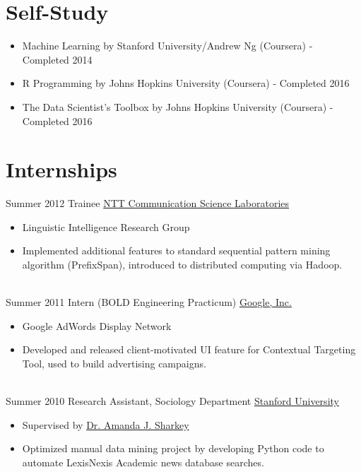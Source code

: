 \documentclass[letterpaper]{twentysecondcv} %
\begin{document}
\section{Self-Study}
\begin{itemize} \itemsep -2pt %
        \item Machine Learning by Stanford University/Andrew Ng (Coursera) - Completed 2014
       	\item R Programming by Johns Hopkins University (Coursera) - Completed 2016
        \item The Data Scientist's Toolbox by Johns Hopkins University (Coursera) - Completed 2016
\end{itemize}


\section{Internships}
\begin{twenty}
	\twentyitem
    	{Summer}
        {2012}
        {Trainee}
        {\href{http://www.kecl.ntt.co.jp/rps/index.html}{NTT Communication Science Laboratories}}
        {}
        {\begin{itemize} \itemsep -2pt %
        \item Linguistic Intelligence Research Group
       	\item Implemented additional features to standard sequential pattern mining algorithm (PrefixSpan), introduced to distributed computing via Hadoop.
        \end{itemize}}
    \\
    \twentyitem
    	{Summer}
        {2011}
        {Intern (BOLD Engineering Practicum)}
        {\href{https://careers.google.com/students/}{Google, Inc.}}
        {}
        {\begin{itemize}  \itemsep -2pt %
        \item Google AdWords Display Network
        \item Developed and released client-motivated UI feature for Contextual Targeting Tool,
            used to build advertising campaigns.
        \end{itemize}}
    \\
    \twentyitem
    	{Summer}
        {2010}
        {Research Assistant, Sociology Department}
        {\href{https://careers.google.com/students/}{Stanford University}}
        {}
        {\begin{itemize}  \itemsep -2pt %
        \item Supervised by \href{https://www.chicagobooth.edu/faculty/directory/s/amanda-j-sharkey}{Dr. Amanda J. Sharkey}
        \item Optimized manual data mining project by developing Python code to automate
            LexisNexis Academic news database searches.
        \end{itemize} }
\end{twenty}
\end{document}
